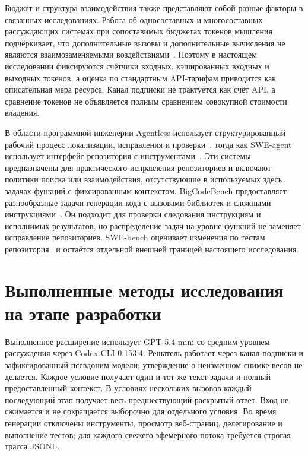Бюджет и структура взаимодействия также представляют собой разные факторы в связанных исследованиях. Работа об односоставных и многосоставных рассуждающих системах при сопоставимых бюджетах токенов мышления подчёркивает, что дополнительные вызовы и дополнительные вычисления не являются взаимозаменяемыми воздействиями~\cite{tran2026budget}. Поэтому в настоящем исследовании фиксируются счётчики входных, кэшированных входных и выходных токенов, а оценка по стандартным API-тарифам приводится как описательная мера ресурса. Канал подписки не трактуется как счёт API, а сравнение токенов не объявляется полным сравнением совокупной стоимости владения.

В области программной инженерии Agentless использует структурированный рабочий процесс локализации, исправления и проверки~\cite{xia2024agentless}, тогда как SWE-agent использует интерфейс репозитория с инструментами~\cite{yang2024sweagent}. Эти системы предназначены для практического исправления репозиториев и включают политики поиска или взаимодействия, отсутствующие в используемых здесь задачах функций с фиксированным контекстом. BigCodeBench предоставляет разнообразные задачи генерации кода с вызовами библиотек и сложными инструкциями~\cite{zhuo2024bigcodebench}. Он подходит для проверки следования инструкциям и исполнимых результатов, но распределение задач на уровне функций не заменяет исправление репозиториев. SWE-bench оценивает изменения по тестам репозитория~\cite{jimenez2023swebench,swebenchdocs2026} и остаётся отдельной внешней границей настоящего исследования.

\section{Выполненные методы исследования на этапе разработки}
\label{sec:dev40-methods}

Выполненное расширение использует GPT-5.4 mini со средним уровнем рассуждения через Codex CLI 0.153.4. Решатель работает через канал подписки и зафиксированный псевдоним модели; утверждение о неизменном снимке весов не делается. Каждое условие получает один и тот же текст задачи и полный предоставленный контекст. В условиях нескольких вызовов каждый последующий этап получает весь предшествующий раскрытый ответ. Вход не сжимается и не сокращается выборочно для отдельного условия. Во время генерации отключены инструменты, просмотр веб-страниц, делегирование и выполнение тестов; для каждого свежего эфемерного потока требуется строгая трасса JSONL.

